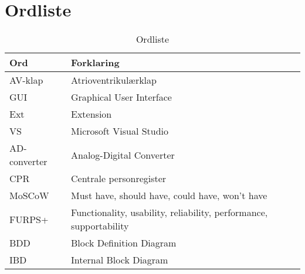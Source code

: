 \chapter{Ordliste}

\flushleft
\begin{table}[h!]
	\begin{tabular}{l|l}
		\textbf{Ord} & \textbf {Forklaring} \\ 
		\hline
		AV-klap & Atrioventrikulærklap \\
		\hline
		GUI & Graphical User Interface \\
		\hline
		Ext & Extension \\
		\hline
		VS & Microsoft Visual Studio \\
		\hline
		AD-converter & Analog-Digital Converter \\
		\hline
		CPR & Centrale personregister \\
		\hline
		MoSCoW & Must have, should have, could have, won't have \\
		\hline
		FURPS+ & Functionality, usability, reliability, performance, supportability \\
		\hline
		BDD & Block Definition Diagram \\
		\hline
		IBD & Internal Block Diagram \\
		\hline
	\end{tabular}
\caption{Ordliste}
\label{table:Ordliste}
\end{table}
